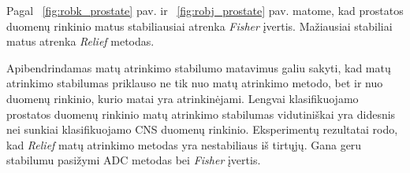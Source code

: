 Pagal ~\ref{fig:robk_prostate} pav. ir ~\ref{fig:robj_prostate} pav. matome, kad prostatos duomenų rinkinio matus stabiliausiai atrenka \textit{Fisher} įvertis. Mažiausiai stabiliai matus atrenka \textit{Relief} metodas.

Apibendrindamas matų atrinkimo stabilumo matavimus galiu sakyti, kad matų atrinkimo stabilumas priklauso ne tik nuo matų atrinkimo metodo, bet ir nuo duomenų rinkinio, kurio matai yra atrinkinėjami. Lengvai klasifikuojamo prostatos duomenų rinkinio matų atrinkimo stabilumas vidutiniškai yra didesnis nei sunkiai klasifikuojamo CNS duomenų rinkinio. Eksperimentų rezultatai rodo, kad \textit{Relief} matų atrinkimo metodas yra nestabiliaus iš tirtųjų. Gana geru stabilumu pasižymi ADC metodas bei \textit{Fisher} įvertis.
